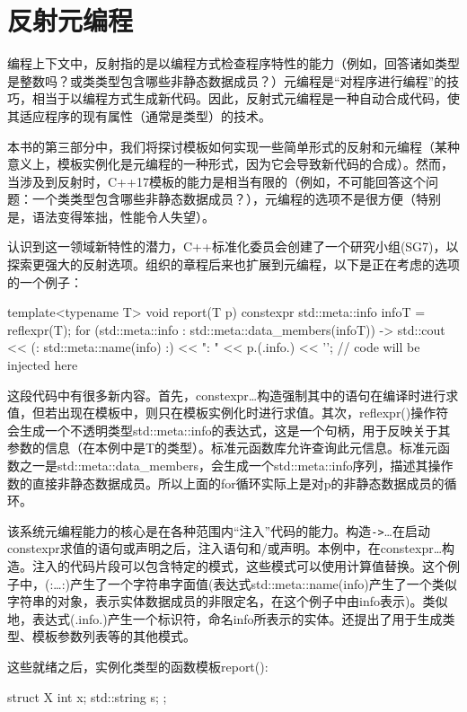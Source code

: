 \section{反射元编程}
编程上下文中，反射指的是以编程方式检查程序特性的能力（例如，回答诸如类型是整数吗？或类类型包含哪些非静态数据成员？）元编程是“对程序进行编程”的技巧，相当于以编程方式生成新代码。因此，反射式元编程是一种自动合成代码，使其适应程序的现有属性（通常是类型）的技术。

本书的第三部分中，我们将探讨模板如何实现一些简单形式的反射和元编程（某种意义上，模板实例化是元编程的一种形式，因为它会导致新代码的合成）。然而，当涉及到反射时，C++17模板的能力是相当有限的（例如，不可能回答这个问题：一个类类型包含哪些非静态数据成员？），元编程的选项不是很方便（特别是，语法变得笨拙，性能令人失望）。

认识到这一领域新特性的潜力，C++标准化委员会创建了一个研究小组(SG7)，以探索更强大的反射选项。组织的章程后来也扩展到元编程，以下是正在考虑的选项的一个例子：

\begin{cpp}
template<typename T> void report(T p) {
	constexpr {
		std::meta::info infoT = reflexpr(T);
		for (std::meta::info : std::meta::data_members(infoT)) {
			-> {
				std::cout << (: std::meta::name(info) :)
				<< ": " << p.(.info.) << '\n';
			}
		}
	}
	// code will be injected here
}
\end{cpp}

这段代码中有很多新内容。首先，constexpr{…}构造强制其中的语句在编译时进行求值，但若出现在模板中，则只在模板实例化时进行求值。其次，reflexpr()操作符会生成一个不透明类型std::meta::info的表达式，这是一个句柄，用于反映关于其参数的信息（在本例中是T的类型）。标准元函数库允许查询此元信息。标准元函数之一是std::meta::data\_members，会生成一个std::meta::info序列，描述其操作数的直接非静态数据成员。所以上面的for循环实际上是对p的非静态数据成员的循环。

该系统元编程能力的核心是在各种范围内“注入”代码的能力。构造\texttt{->}{…}在启动constexpr求值的语句或声明之后，注入语句和/或声明。本例中，在constexpr{…}构造。注入的代码片段可以包含特定的模式，这些模式可以使用计算值替换。这个例子中，(:…:)产生了一个字符串字面值(表达式std::meta::name(info)产生了一个类似字符串的对象，表示实体数据成员的非限定名，在这个例子中由info表示)。类似地，表达式(.info.)产生一个标识符，命名info所表示的实体。还提出了用于生成类型、模板参数列表等的其他模式。

这些就绪之后，实例化类型的函数模板report():

\begin{cpp}
struct X {
	int x;
	std::string s;
};
\end{cpp}


